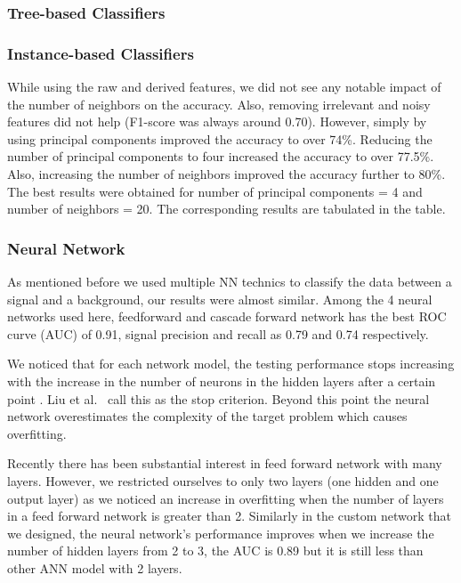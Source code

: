 \subsubsection{Tree-based Classifiers}

\subsubsection{Instance-based Classifiers}

While using the raw and derived features, we did not see any notable impact of the number of neighbors on the accuracy. Also, removing irrelevant and noisy features did not help (F1-score was always around 0.70). However, simply by using principal components improved the accuracy to over 74\%. Reducing the number of principal components to four increased the accuracy to over 77.5\%. Also, increasing the number of neighbors improved the accuracy further to 80\%. The best results were obtained for number of principal components = 4 and number of neighbors = 20. The corresponding results are tabulated in the table.

\subsubsection{Neural Network}
As mentioned before we used multiple NN technics to classify the data between a signal and a background, our results were almost similar. Among the 4 neural networks used here, feedforward and cascade forward network has the best ROC curve (AUC) of 0.91, signal precision and recall as 0.79 and 0.74 respectively.  

We noticed that for each network model, the testing performance stops increasing with the increase in the number of neurons in the hidden layers after a certain point . Liu et al.~\cite{NN-Result} call this as the stop criterion. Beyond this point the neural network overestimates the complexity of the target problem which causes overfitting.

Recently there has been substantial interest in feed forward network with many layers. However, we restricted ourselves to only two layers (one hidden and one output layer) as we noticed an increase in overfitting when the number of layers in a feed forward network is greater than 2.  Similarly in the custom network that we designed, the neural network's performance improves when we increase the number of hidden layers from 2 to 3, the AUC is 0.89 but it is still less than other ANN model with 2 layers. 


